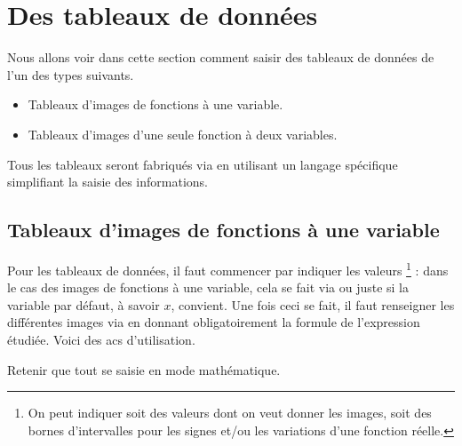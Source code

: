 \documentclass[10pt, a4paper]{article}
\begin{document}
\section{Des tableaux de données}

Nous allons voir dans cette section comment saisir des tableaux de données de l'un des types suivants.
\begin{itemize}
	\item Tableaux d'images de fonctions à une variable.

	\item Tableaux d'images d'une seule fonction à deux variables.
\end{itemize}


\begin{tdocnote}
	Tous les tableaux seront fabriqués via  en utilisant un langage spécifique simplifiant la saisie des informations.
\end{tdocnote}





\subsection{Tableaux d'images de fonctions à une variable}

Pour les tableaux de données, il faut commencer par indiquer les valeurs 
\footnote{
	 On peut indiquer soit des valeurs dont on veut donner les images, soit des bornes d'intervalles pour les signes et/ou les variations d'une fonction réelle.
} :
dans le cas des images de fonctions à une variable, cela se fait via
ou juste
si la variable par défaut, à savoir $x$, convient.
Une fois ceci se fait, il faut renseigner les différentes images via  en donnant obligatoirement la formule de l'expression étudiée. Voici des acs d'utilisation.




\begin{tdocexa}
    \leavevmode

\end{tdocexa}


\begin{tdocnote}
	Retenir que tout se saisie en mode mathématique.
\end{tdocnote}
\end{document}
